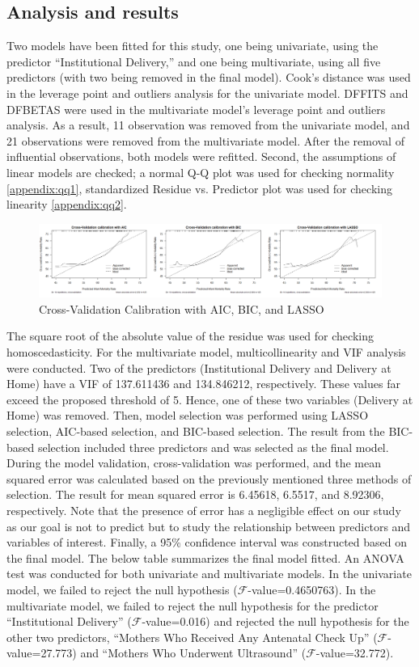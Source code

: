 \documentclass{article}
\begin{document}
\subsection{Analysis and results}
Two models have been fitted for this study, one being univariate, using the predictor ``Institutional Delivery,'' and one being multivariate, using all five predictors (with two being removed in the final model). Cook's distance was used in the leverage point and outliers analysis for the univariate model. DFFITS and DFBETAS were used in the multivariate model's leverage point and outliers analysis. As a result, 11 observation was removed from the univariate model, and 21 observations were removed from the multivariate model. After the removal of influential observations, both models were refitted. Second, the assumptions of linear models are checked; a normal Q-Q plot was used for checking normality \ref{appendix:qq1}, standardized Residue vs. Predictor plot was used for checking linearity \ref{appendix:qq2}.
\begin{figure}[!ht]
    \centering
    \includegraphics[width=1.0\textwidth]{cross validation.png}
    \caption{\label{fig:}Cross-Validation Calibration with AIC, BIC, and LASSO}
\end{figure}
The square root of the absolute value of the residue was used for checking homoscedasticity. For the multivariate model, multicollinearity and VIF analysis were conducted. Two of the predictors (Institutional Delivery and Delivery at Home) have a VIF of 137.611436 and 134.846212, respectively. These values far exceed the proposed threshold of 5. Hence, one of these two variables (Delivery at Home) was removed. Then, model selection was performed using LASSO selection, AIC-based selection, and BIC-based selection. The result from the BIC-based selection included three predictors and was selected as the final model. During the model validation, cross-validation was performed, and the mean squared error was calculated based on the previously mentioned three methods of selection. The result for mean squared error is 6.45618, 6.5517, and 8.92306, respectively. Note that the presence of error has a negligible effect on our study as our goal is not to predict but to study the relationship between predictors and variables of interest. Finally, a 95\% confidence interval was constructed based on the final model. The below table summarizes the final model fitted. An ANOVA test was conducted for both univariate and multivariate models. In the univariate model, we failed to reject the null hypothesis ($\mathcal{F}$-value=0.4650763). In the multivariate model, we failed to reject the null hypothesis for the predictor ``Institutional Delivery'' ($\mathcal{F}$-value=0.016) and rejected the null hypothesis for the other two predictors, ``Mothers Who Received Any Antenatal Check Up'' ($\mathcal{F}$-value=27.773) and ``Mothers Who Underwent Ultrasound'' ($\mathcal{F}$-value=32.772).  
\end{document}
